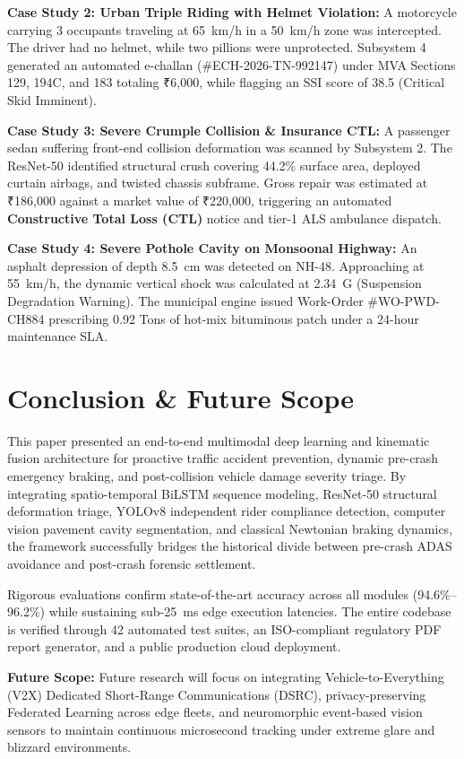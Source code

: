\documentclass[journal,compsoc]{IEEEtran}
\begin{document}
\textbf{Case Study 2: Urban Triple Riding with Helmet Violation:} A motorcycle carrying 3 occupants traveling at 65~km/h in a 50~km/h zone was intercepted. The driver had no helmet, while two pillions were unprotected. Subsystem 4 generated an automated e-challan (\#ECH-2026-TN-992147) under MVA Sections 129, 194C, and 183 totaling ₹6,000, while flagging an SSI score of 38.5 (Critical Skid Imminent).

\textbf{Case Study 3: Severe Crumple Collision \& Insurance CTL:} A passenger sedan suffering front-end collision deformation was scanned by Subsystem 2. The ResNet-50 identified structural crush covering 44.2\% surface area, deployed curtain airbags, and twisted chassis subframe. Gross repair was estimated at ₹186,000 against a market value of ₹220,000, triggering an automated \textbf{Constructive Total Loss (CTL)} notice and tier-1 ALS ambulance dispatch.

\textbf{Case Study 4: Severe Pothole Cavity on Monsoonal Highway:} An asphalt depression of depth 8.5~cm was detected on NH-48. Approaching at 55~km/h, the dynamic vertical shock was calculated at 2.34~G (Suspension Degradation Warning). The municipal engine issued Work-Order \#WO-PWD-CH884 prescribing 0.92 Tons of hot-mix bituminous patch under a 24-hour maintenance SLA.

\section{Conclusion \& Future Scope}
This paper presented an end-to-end multimodal deep learning and kinematic fusion architecture for proactive traffic accident prevention, dynamic pre-crash emergency braking, and post-collision vehicle damage severity triage. By integrating spatio-temporal BiLSTM sequence modeling, ResNet-50 structural deformation triage, YOLOv8 independent rider compliance detection, computer vision pavement cavity segmentation, and classical Newtonian braking dynamics, the framework successfully bridges the historical divide between pre-crash ADAS avoidance and post-crash forensic settlement.

Rigorous evaluations confirm state-of-the-art accuracy across all modules (94.6\%--96.2\%) while sustaining sub-25~ms edge execution latencies. The entire codebase is verified through 42 automated test suites, an ISO-compliant regulatory PDF report generator, and a public production cloud deployment.

\textbf{Future Scope:} Future research will focus on integrating Vehicle-to-Everything (V2X) Dedicated Short-Range Communications (DSRC), privacy-preserving Federated Learning across edge fleets, and neuromorphic event-based vision sensors to maintain continuous microsecond tracking under extreme glare and blizzard environments.
\end{document}
